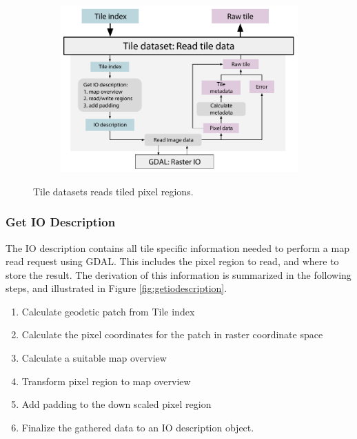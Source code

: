 \begin{figure}[htbp]
    \centering
    \begin{subfigure}[bt]{0.8\textwidth}
        \includegraphics[width=\textwidth]{figures/implementation/pipeline/tiledataset.pdf}
    \end{subfigure}
    \caption{Tile datasets reads tiled pixel regions.}
    \label{fig:tiledataset}
\end{figure}

\subsubsection{Get IO Description}
The IO description contains all tile specific information needed to perform a map read request using GDAL. This includes the pixel region to read, and where to store the result. The derivation of this information is summarized in the following steps, and illustrated in Figure \ref{fig:getiodescription}.

\begin{enumerate}
\item Calculate geodetic patch from Tile index
\item Calculate the pixel coordinates for the patch in raster coordinate space
\item Calculate a suitable map overview
\item Transform pixel region to map overview
\item Add padding to the down scaled pixel region
\item Finalize the gathered data to an IO description object.
\end{enumerate}

